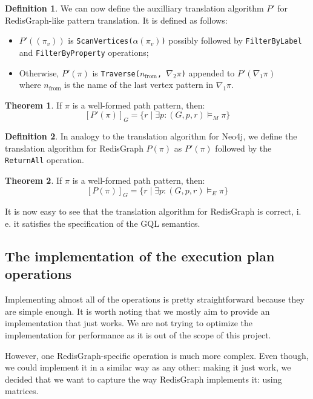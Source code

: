 \documentclass[14pt]{constructor-thesis}
\theoremstyle{definition}
\newtheorem{theorem}{Theorem}
\newtheorem{definition}{Definition}
\begin{document}
\begin{definition}
  We can now define the auxilliary translation algorithm $P'$ for RedisGraph-like pattern translation. It is defined as follows:
  \begin{itemize}
    \item $P'((\pi_v))$ is \texttt{ScanVertices($\alpha(\pi_v)$)} possibly followed by \texttt{FilterByLabel} and \texttt{FilterByProperty} operations;
    \item Otherwise, $P'(\pi)$ is \texttt{Traverse($n_{\mathrm{from}}$, $\nabla_2 \pi$)} appended to $P'(\nabla_1 \pi)$ \\ where $n_{\mathrm{from}}$ is the name of the last vertex pattern in $\nabla_1 \pi$.
  \end{itemize}
\end{definition}

\begin{theorem}
  If $\pi$ is a well-formed path pattern, then:
  $$ [P'(\pi)]_G = \{ r \mid \exists p : (G, p, r) \models_M \pi \} $$
\end{theorem}

\begin{definition}
  In analogy to the translation algorithm for Neo4j, we define the translation algorithm for RedisGraph $P(\pi)$ as $P'(\pi)$ followed by the \texttt{ReturnAll} operation.
\end{definition}

\begin{theorem}
  If $\pi$ is a well-formed path pattern, then:
  $$ [P(\pi)]_G = \{ r \mid \exists p : (G, p, r) \models_E \pi \} $$
\end{theorem}

It is now easy to see that the translation algorithm for RedisGraph is correct, i. e. it satisfies the specification of the GQL semantics.

\subsection{The implementation of the execution plan operations}

Implementing almost all of the operations is pretty straightforward because they are simple enough. It is worth noting that we mostly aim to provide an implementation that just works. We are not trying to optimize the implementation for performance as it is out of the scope of this project.

However, one RedisGraph-specific operation is much more complex. Even though, we could implement it in a similar way as any other: making it just work, we decided that we want to capture the way RedisGraph implements it: using matrices. 
\end{document}
